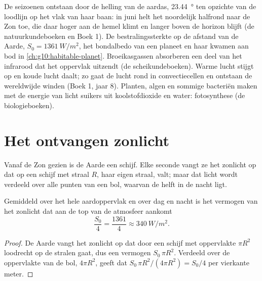 \begin{recall}
De seizoenen ontstaan door de helling van de aardas, \qty{23.44}{\degree} ten
opzichte van de loodlijn op het vlak van haar baan: in juni helt het noordelijk
halfrond naar de Zon toe, die daar hoger aan de hemel klimt en langer
boven de horizon blijft (de natuurkundeboeken en Boek 1). De
bestralingssterkte op de afstand van de Aarde, $S_0 = \qty{1361}{W/m^2}$, het
bondalbedo van een planeet en haar  kwamen aan bod in
\cref{ch:g10:habitable-planet}. Broeikasgassen absorberen een deel van het
infrarood dat het oppervlak uitzendt (de scheikundeboeken). Warme lucht stijgt
op en koude lucht daalt; zo gaat de lucht rond in convectiecellen en ontstaan
de wereldwijde winden (Boek 1, jaar 8). Planten, algen en sommige bacteriën
maken met de energie van licht suikers uit koolstofdioxide en water:
fotosynthese (de biologieboeken).
\end{recall}

\section{Het ontvangen zonlicht}

Vanaf de Zon gezien is de Aarde een schijf. Elke seconde vangt ze het zonlicht
op dat op een schijf met straal $R$, haar eigen straal, valt; maar dat licht
wordt verdeeld over alle punten van een bol, waarvan de helft in de nacht ligt.

\begin{proposition}\label{prop:g10:earth-energy-budget:quarter}
Gemiddeld over het hele aardoppervlak en over dag en nacht is het vermogen van
het zonlicht dat aan de top van de atmosfeer aankomt
\[
  \frac{S_0}{4} = \frac{1361}{4} \approx \qty{340}{W/m^2}.
\]
\end{proposition}

\begin{proof}
De Aarde vangt het zonlicht op dat door een schijf met oppervlakte $\pi R^2$
loodrecht op de stralen gaat, dus een vermogen $S_0\,\pi R^2$. Verdeeld over de
oppervlakte van de bol, $4\pi R^2$, geeft dat $S_0\,\pi R^2/(4\pi R^2) =
S_0/4$ per vierkante meter.
\end{proof}

